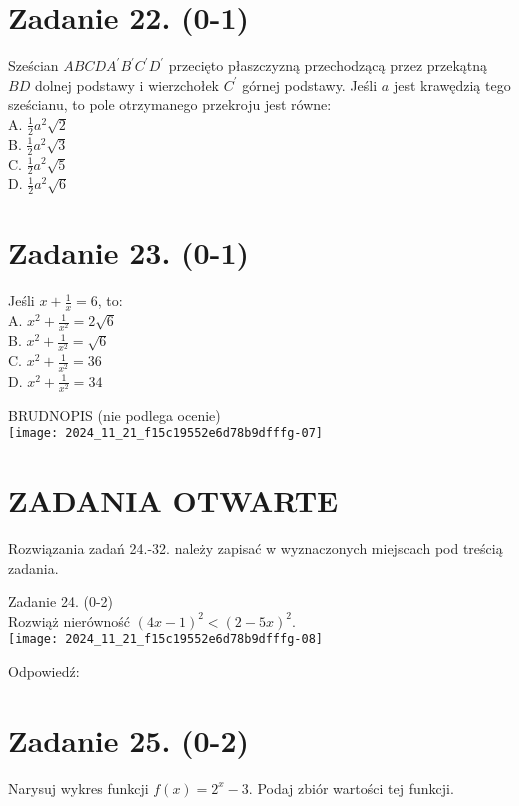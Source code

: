 \documentclass[10pt]{article}
\begin{document}
\section*{Zadanie 22. (0-1)}
Sześcian \(A B C D A^{\prime} B^{\prime} C^{\prime} D^{\prime}\) przecięto płaszczyzną przechodzącą przez przekątną \(B D\) dolnej podstawy i wierzchołek \(C^{\prime}\) górnej podstawy. Jeśli \(a\) jest krawędzią tego sześcianu, to pole otrzymanego przekroju jest równe:\\
A. \(\frac{1}{2} a^{2} \sqrt{2}\)\\
B. \(\frac{1}{2} a^{2} \sqrt{3}\)\\
C. \(\frac{1}{2} a^{2} \sqrt{5}\)\\
D. \(\frac{1}{2} a^{2} \sqrt{6}\)

\section*{Zadanie 23. (0-1)}
Jeśli \(x+\frac{1}{x}=6\), to:\\
A. \(x^{2}+\frac{1}{x^{2}}=2 \sqrt{6}\)\\
B. \(x^{2}+\frac{1}{x^{2}}=\sqrt{6}\)\\
C. \(x^{2}+\frac{1}{x^{2}}=36\)\\
D. \(x^{2}+\frac{1}{x^{2}}=34\)

BRUDNOPIS (nie podlega ocenie)\\
\texttt{[image: 2024\_11\_21\_f15c19552e6d78b9dfffg-07]}

\section*{ZADANIA OTWARTE}
Rozwiązania zadań 24.-32. należy zapisać w wyznaczonych miejscach pod treścią zadania.

Zadanie 24. (0-2)\\
Rozwiąż nierówność \((4 x-1)^{2}<(2-5 x)^{2}\).\\
\texttt{[image: 2024\_11\_21\_f15c19552e6d78b9dfffg-08]}

Odpowiedź:

\section*{Zadanie 25. (0-2)}
Narysuj wykres funkcji \(f(x)=2^{x}-3\). Podaj zbiór wartości tej funkcji.
\end{document}
